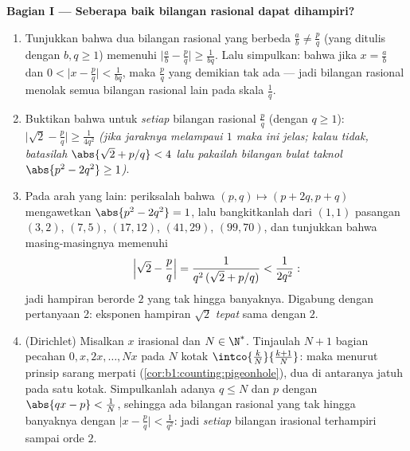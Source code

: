 \begin{problem}
\medskip
\noindent\textbf{Bagian I --- Seberapa baik bilangan rasional dapat
dihampiri?}
\begin{enumerate}
  \item Tunjukkan bahwa dua bilangan rasional yang berbeda $\frac ab \neq \frac pq$
        (yang ditulis dengan $b, q \geq 1$) memenuhi $\bigl|\frac ab -
        \frac pq\bigr| \geq \frac{1}{bq}$. Lalu simpulkan: bahwa jika $x =
        \frac ab$ dan $0 < \bigl|x - \frac pq\bigr| <
        \frac{1}{bq}$, maka $\frac pq$ yang demikian tak ada --- jadi bilangan rasional
        menolak semua bilangan rasional lain pada skala $\frac 1q$.
  \item Buktikan bahwa untuk \emph{setiap} bilangan rasional $\frac pq$ (dengan $q \geq
        1$): $\bigl|\sqrt2 - \frac pq\bigr| \geq
        \frac{1}{4q^2}$ \emph{(jika jaraknya melampaui $1$ maka ini
        jelas; kalau tidak, batasilah $\abs{\sqrt2 + p/q} < 4$ lalu
        pakailah bilangan bulat taknol $\abs{p^2 - 2q^2} \geq 1$)}.
  \item Pada arah yang lain: periksalah bahwa $(p, q) \mapsto (p +
        2q, p + q)$ mengawetkan $\abs{p^2 - 2q^2} = 1$, lalu bangkitkanlah
        dari $(1,1)$ pasangan $(3,2)$, $(7,5)$, $(17,12)$,
        $(41,29)$, $(99,70)$, dan tunjukkan bahwa masing-masingnya memenuhi
        \[
        \Bigl|\sqrt2 - \frac pq\Bigr| =
        \frac{1}{q^2\,(\sqrt2 + p/q)} < \frac{1}{2q^2} :
        \]
        jadi hampiran berorde $2$ yang tak hingga banyaknya. Digabung dengan
        pertanyaan 2: eksponen hampiran $\sqrt 2$ \emph{tepat}
        sama dengan $2$.
  \item (Dirichlet) Misalkan $x$ irasional dan $N \in \N^*$.
        Tinjaulah $N + 1$ bagian pecahan $0, x, 2x,
        \dots, Nx$ pada $N$ kotak $\intco{\frac kN}{\frac{k +
        1}{N}}$: maka menurut prinsip sarang merpati
        (\cref{cor:b1:counting:pigeonhole}), dua di antaranya jatuh pada satu kotak.
        Simpulkanlah adanya $q \leq N$ dan $p$ dengan $\abs{qx - p} <
        \frac 1N$, sehingga ada bilangan rasional yang tak hingga banyaknya dengan
        $\bigl|x - \frac pq\bigr| < \frac{1}{q^2}$: jadi \emph{setiap}
        bilangan irasional terhampiri sampai orde $2$.
\end{enumerate}


\end{problem}

